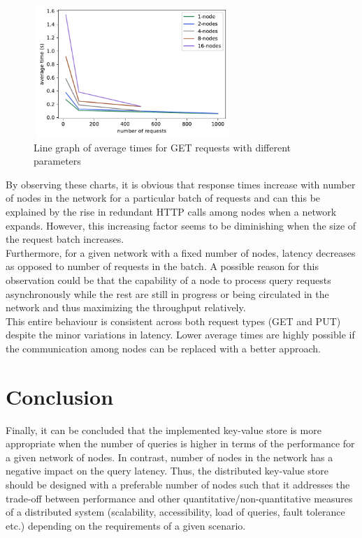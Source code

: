 \documentclass[
    a4paper,
    twocolumn,
]{article}
\begin{document}
\setlength{\intextsep}{5pt plus 2pt minus 0pt}
\begin{figure}[!ht]
	\centering
	\includegraphics[width=7.5cm, height=5cm]{get_line.pdf}
	\caption{Line graph of average times for GET requests with different parameters}
\end{figure}

By observing these charts, it is obvious that response times increase with number of nodes in the network for a particular batch of requests and can this be explained by the rise in redundant HTTP calls among nodes when a network expands. However, this increasing factor seems to be diminishing when the size of the request batch increases. \\

Furthermore, for a given network with a fixed number of nodes, latency decreases as opposed to number of requests in the batch. A possible reason for this observation could be that the capability of a node to process query requests asynchronously while the rest are still in progress or being circulated in the network and thus maximizing the throughput relatively.\\

This entire behaviour is consistent across both request types (GET and PUT) despite the minor variations in latency. Lower average times are highly possible if the communication among nodes can be replaced with a better approach.

\section{Conclusion}

Finally, it can be concluded that the implemented key-value store is more appropriate when the number of queries is higher in terms of the performance for a given network of nodes. In contrast, number of nodes in the network has a negative impact on the query latency. Thus, the distributed key-value store should be designed with a preferable number of nodes such that it addresses the trade-off between performance and other quantitative/non-quantitative measures of a distributed system (scalability, accessibility, load of queries, fault tolerance etc.) depending on the requirements of a given scenario.
\end{document}
